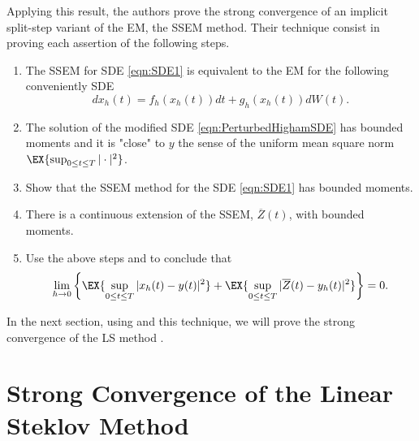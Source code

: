 \documentclass[sort&compress, preprint]{elsarticle}
\theoremstyle{definition}
\theoremstyle{plain}%
\theoremstyle{remark}
\newcommand{\SM}{LS\xspace}
\begin{document}
	Applying this result, the authors prove the strong convergence of an implicit split-step variant of the EM, the
SSEM method. 
Their technique consist in proving each assertion of the following steps.
\begin{enumerate}[\bf{Step} 1:]
	\item
		\label{stp:EMCorrespondence}
		The SSEM for SDE \eqref{eqn:SDE1} is equivalent to the EM for the following conveniently SDE
		\begin{equation}\label{eqn:PerturbedHighamSDE}
			dx_h(t)= f_h(x_h(t))dt +g_h(x_h(t))dW(t).
		\end{equation}
	\item\label{stp:PerturbedSolution}
			The solution of the modified SDE \eqref{eqn:PerturbedHighamSDE} has bounded moments and it is 
			"close" to  $y$ the sense of the uniform mean square norm 
			$
				\EX{\sup_{0\leq t\leq T}|\cdot|^2}
			$.
	\item
	\label{stp:MethodBoundedMoments}
		Show that the SSEM method for the SDE \eqref{eqn:SDE1} has bounded moments.
	\item
		There is a continuous extension of the SSEM, $\overline{Z}(t)$, with bounded moments.
	\item
		Use the above steps and  to conclude that
		\begin{equation}
			\lim_{h\to 0}
			\left\{
				\EX{\sup_{0\leq t\leq T}|x_h(t)-y(t)|^2}
			+
			\EX{\sup_{0\leq t\leq T}|\overline{Z}(t) -y_h(t)|^2}
			\right\}=0.
		\end{equation}
\end{enumerate}

	In the next section, using  and this technique, we will prove the strong convergence of the 
\SM method .
%

\section{Strong Convergence of the Linear Steklov Method} 
\end{document}
